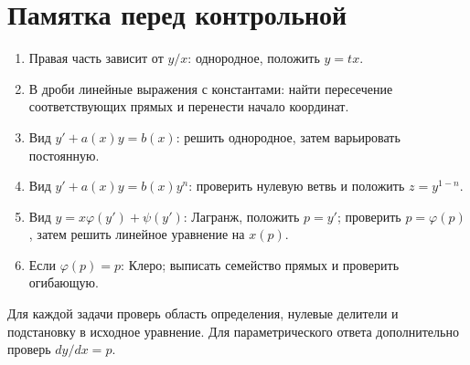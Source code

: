\documentclass[12pt,a4paper]{article}
\begin{document}
\section{Памятка перед контрольной}
\begin{enumerate}[leftmargin=*]
\item Правая часть зависит от $y/x$: однородное, положить $y=tx$.
\item В дроби линейные выражения с константами: найти пересечение соответствующих прямых и перенести начало координат.
\item Вид $y'+a(x)y=b(x)$: решить однородное, затем варьировать постоянную.
\item Вид $y'+a(x)y=b(x)y^n$: проверить нулевую ветвь и положить $z=y^{1-n}$.
\item Вид $y=x\varphi(y')+\psi(y')$: Лагранж, положить $p=y'$; проверить $p=\varphi(p)$, затем решить линейное уравнение на $x(p)$.
\item Если $\varphi(p)=p$: Клеро; выписать семейство прямых и проверить огибающую.
\end{enumerate}
Для каждой задачи проверь область определения, нулевые делители и подстановку в исходное уравнение. Для параметрического ответа дополнительно проверь $dy/dx=p$.
\end{document}
